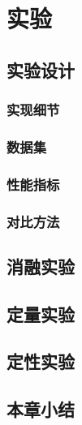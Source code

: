 
\chapter{实验}
\label{cha:experiments}

\section{实验设计}
\label{sec:experiments_settings}

\subsection{实现细节}
\label{sub:implementation_details}

\subsection{数据集}
\label{sub:datasets}

\subsection{性能指标}
\label{sub:performance_metrics}

\subsection{对比方法}
\label{sub:baselines}

\section{消融实验}
\label{sec:ablation_study}

\section{定量实验}
\label{sec:quantitative_comparisons}

\section{定性实验}
\label{sec:qualitative_results}

\section{本章小结}
\label{sec:experiments_conclution}
